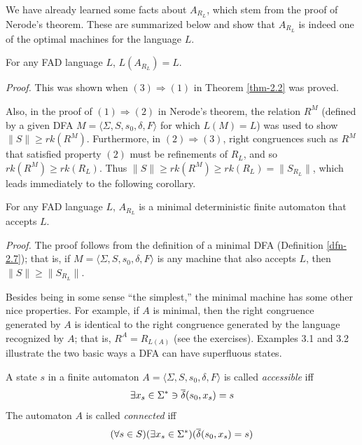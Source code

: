 We have already learned some facts about $A_{R_L}$, which stem from
the proof of Nerode's theorem. These are summarized below and show
that $A_{R_L}$ is indeed one of the optimal machines for the language $L$.

\begin{cor}\label{cor-3.1}
For any FAD language $L$, $L(A_{R_L}) = L$.

\emph{Proof.} This was shown when $(3) \Rightarrow (1)$ in Theorem \ref{thm-2.2} was
proved.
\end{cor}

Also, in the proof of $(1) \Rightarrow (2)$ in Nerode's theorem, the relation
$R^M$ (defined by a given DFA $M= \langle\Sigma,S,s_0,\delta,F\rangle$ for which $L(M)=L$)
was used to show $\|S\| \geq rk(R^M)$. Furthermore, in $(2) \Rightarrow (3)$,
right congruences such as $R^M$ that satisfied property $(2)$ must be
refinements of $R_L$, and so $rk(R^M) \geq rk(R_L)$. Thus
$\|S\| \geq rk(R^M) \geq rk(R_L) = \|S_{R_L}\|$, which leads immediately to the
following corollary.

\begin{cor}\label{cor-3.2}
For any FAD language $L$, $A_{R_L}$ is a minimal deterministic finite automaton
that accepts $L$.

\emph{Proof.} The proof follows from the definition of a minimal DFA (Definition
\ref{dfn-2.7}); that is, if $M =\langle\Sigma,S,s_0,\delta,F\rangle$ is any machine that also
accepts $L$, then $\|S\| \geq \|S_{R_L}\|$.
\end{cor}

Besides being in some sense ``the simplest,'' the minimal machine has some
other nice properties. For example, if $A$ is minimal, then the right congruence
generated by $A$ is identical to the right congruence generated by the language
recognized by $A$; that is, $R^A = R_{L(A)}$ (see the exercises). Examples 3.1
and 3.2 illustrate the two basic ways a DFA can have superfluous states.

\begin{dfn}\label{dfn-3.1}
A state $s$ in a finite automaton $A =\langle\Sigma,S,s_0,\delta,F\rangle$ is called
\emph{accessible} iff
\[ \exists x_s \in \Sigma^* \ni \overline{\delta}(s_0,x_s) = s \]
The automaton $A$ is called \emph{connected} iff
\[ (\forall s \in S)(\exists x_s \in \Sigma^*)(\overline{\delta}(s_0,x_s)=s) \]
\end{dfn}

